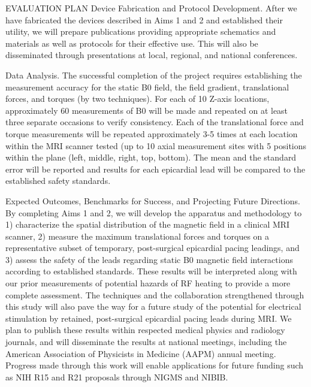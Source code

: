 EVALUATION PLAN
Device Fabrication and Protocol Development. After we have fabricated the devices described in Aims 1 and 2 and
established their utility, we will prepare publications providing appropriate schematics and materials as well as protocols
for their effective use. This will also be disseminated through presentations at local, regional, and national conferences.

Data Analysis. The successful completion of the project requires establishing the measurement accuracy for the static B0
field, the field gradient, translational forces, and torques (by two techniques). For each of 10 Z-axis locations, approximately
60 measurements of B0 will be made and repeated on at least three separate occasions to verify consistency. Each of the
translational force and torque measurements will be repeated approximately 3-5 times at each location within the MRI
scanner tested (up to 10 axial measurement sites with 5 positions within the plane (left, middle, right, top, bottom). The
mean and the standard error will be reported and results for each epicardial lead will be compared to the established safety
standards.

Expected Outcomes, Benchmarks for Success, and Projecting Future Directions. By completing Aims 1 and 2, we will
develop the apparatus and methodology to 1) characterize the spatial distribution of the magnetic field in a clinical MRI
scanner, 2) measure the maximum translational forces and torques on a representative subset of temporary, post-surgical
epicardial pacing leadings, and 3) assess the safety of the leads regarding static B0 magnetic field interactions according to
established standards. These results will be interpreted along with our prior measurements of potential hazards of RF heating
to provide a more complete assessment. The techniques and the collaboration strengthened through this study will also pave
the way for a future study of the potential for electrical stimulation by retained, post-surgical epicardial pacing leads during
MRI. We plan to publish these results within respected medical physics and radiology journals, and will disseminate the
results at national meetings, including the American Association of Physicists in Medicine (AAPM) annual meeting.
Progress made through this work will enable applications for future funding such as NIH R15 and R21 proposals through
NIGMS and NIBIB.
